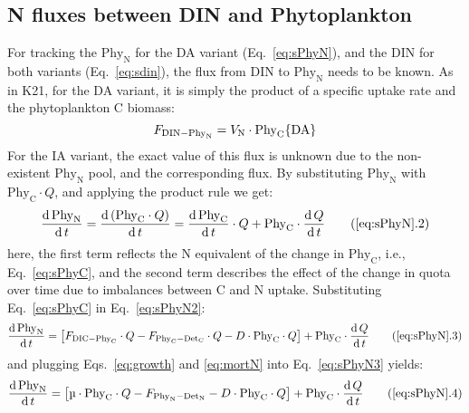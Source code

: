 \documentclass[gmd, manuscript]{copernicus}
\begin{document}
\subsection{N fluxes between DIN and Phytoplankton}\label{S:DescFlux}
For tracking the $\text{Phy}_{\text{N}}$ for the DA variant (Eq.~\ref{eq:sPhyN}), and the DIN for both variants (Eq.~\ref{eq:sdin}), the flux from DIN to $\text{Phy}_{\text{N}}$ needs to be known. As in K21, for the DA variant, it is simply the product of a specific uptake rate and the phytoplankton C biomass:
\begin{equation}
  \label{eq:Fdinphyn}
  F_{\text{DIN}-\text{Phy}_{\text{N}}} = V_{\text{N}} \cdot \text{Phy}_{\text{C}} \hfill \{\text{DA}\}
\end{equation}
For the IA variant, the exact value of this flux is unknown due to the non-existent $\text{Phy}_{\text{N}}$ pool, and the corresponding flux. By substituting $\text{Phy}_{\text{N}}$ with  $\text{Phy}_{\text{C}}\cdot Q$, and applying the product rule we get:
\begin{equation}
  \label{eq:sPhyN2}
  \frac{\mathrm{d}\,\text{Phy}_{\text{N}}}{\mathrm{d}\,t} = \frac{\mathrm{d}\,(\text{Phy}_{\text{C}}\cdot Q)}{\mathrm{d}\,t}
  = \frac{\mathrm{d}\,\text{Phy}_{\text{C}}}{\mathrm{d}\,t} \cdot Q + \text{Phy}_{\text{C}} \cdot \frac{\mathrm{d}\,Q}{\mathrm{d}\,t} \tag{\ref{eq:sPhyN}.2}
\end{equation}
here, the first term reflects the N equivalent of the change in $\text{Phy}_{\text{C}}$, i.e., Eq.~\eqref{eq:sPhyC}, and the second term describes the effect of the change in quota over time due to imbalances between C and N uptake. Substituting Eq.~\eqref{eq:sPhyC} in Eq.~\eqref{eq:sPhyN2}:
\begin{equation}
  \label{eq:sPhyN3}
  \frac{\mathrm{d}\,\text{Phy}_{\text{N}}}{\mathrm{d}\,t} = \left[ F_{\text{DIC}-\text{Phy}_{\text{C}}} \cdot Q - F_{\text{Phy}_{\text{C}}-\text{Det}_{\text{C}}} \cdot Q - D \cdot \text{Phy}_{\text{C}} \cdot Q \right] + \text{Phy}_{\text{C}} \cdot \frac{\mathrm{d}\,Q}{\mathrm{d}\,t}
 \tag{\ref{eq:sPhyN}.3}
\end{equation}
and plugging Eqs.~\eqref{eq:growth} and \eqref{eq:mortN} into Eq.~\eqref{eq:sPhyN3} yields:
\begin{equation}
  \label{eq:sPhyN4}
  \frac{\mathrm{d}\,\text{Phy}_{\text{N}}}{\mathrm{d}\,t} = \left[ \mu \cdot \text{Phy}_{\text{C}} \cdot Q - F_{\text{Phy}_{\text{N}}-\text{Det}_{\text{N}}} - D \cdot \text{Phy}_{\text{C}} \cdot Q \right] + \text{Phy}_{\text{C}} \cdot \frac{\mathrm{d}\,Q}{\mathrm{d}\,t}
 \tag{\ref{eq:sPhyN}.4}
\end{equation}
\end{document}
